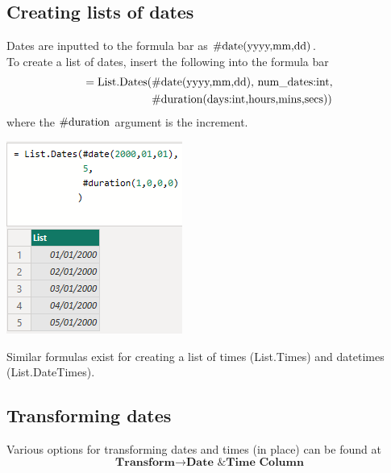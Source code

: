 \documentclass[10pt, openany, twocolumn]{book}
\begin{document}
\subsection*{Creating lists of dates}

Dates are inputted to the formula bar as $\#\textup{date(yyyy,mm,dd)}$. \\

To create a list of dates, insert the following into the formula bar
\begin{align*}
=\textup{List.Dates(}&\#\textup{date(yyyy,mm,dd), num\_dates:int,} \\
&\#\textup{duration(days:int,hours,mins,secs))}   
\end{align*}
where the $\#\textup{duration}$ argument is the increment.\\

\begin{center}
    \includegraphics[width = 0.80\columnwidth]{images/list_of_dates.png}
\end{center}


Similar formulas exist for creating a list of times (List.Times) and datetimes (List.DateTimes).

\subsection*{Transforming dates}

Various options for transforming dates and times (in place) can be found at
$$\textbf{Transform} \rightarrow \textbf{Date \& Time Column}$$
\end{document}

